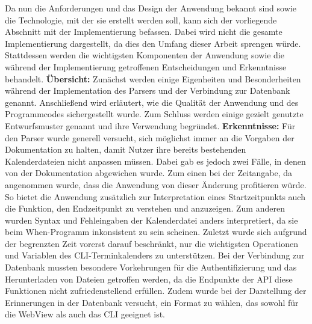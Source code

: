 %
	Da nun die Anforderungen und das Design der Anwendung bekannt sind sowie die Technologie, mit der sie erstellt werden soll, kann sich der vorliegende Abschnitt mit der Implementierung befassen.
	Dabei wird nicht die gesamte Implementierung dargestellt, da dies den Umfang dieser Arbeit sprengen würde. Stattdessen werden die wichtigsten Komponenten der Anwendung sowie die während der Implementierung getroffenen Entscheidungen und Erkenntnisse behandelt.%
\newline%
\textbf{Übersicht:}\newline%
Zunächst werden einige Eigenheiten und Besonderheiten während der Implementation des Parsers und der Verbindung zur Datenbank genannt. Anschließend wird erläutert, wie die Qualität der Anwendung und des Programmcodes sichergestellt wurde. Zum Schluss werden einige gezielt genutzte Entwurfsmuster genannt und ihre Verwendung begründet.%
\newline%
\textbf{Erkenntnisse:}\newline%
	Für den Parser wurde generell versucht, sich möglichst immer an die Vorgaben der Dokumentation zu halten, damit Nutzer ihre bereits bestehenden Kalenderdateien nicht anpassen müssen. Dabei gab es jedoch zwei Fälle, in denen von der Dokumentation abgewichen wurde. %
		Zum einen bei der Zeitangabe, da angenommen wurde, dass die Anwendung von dieser Änderung profitieren würde. So bietet die Anwendung zusätzlich zur Interpretation eines Startzeitpunkts auch die Funktion, den Endzeitpunkt zu verstehen und anzuzeigen. %
		Zum anderen wurden Syntax und Fehleingaben der Kalenderdatei anders interpretiert, da sie beim When-Programm inkonsistent zu sein scheinen. %
		Zuletzt wurde sich aufgrund der begrenzten Zeit vorerst darauf beschränkt, nur die wichtigsten Operationen und Variablen des CLI-Terminkalenders zu unterstützen.%
	\newline%
	Bei der Verbindung zur Datenbank mussten besondere Vorkehrungen für die Authentifizierung und das Herunterladen von Dateien getroffen werden, da die Endpunkte der API diese Funktionen nicht zufriedenstellend erfüllen. Zudem wurde bei der Darstellung der Erinnerungen in der Datenbank versucht, ein Format zu wählen, das sowohl für die WebView als auch das CLI geeignet ist.%
